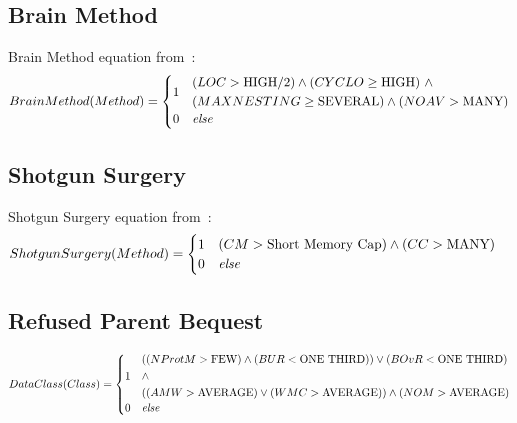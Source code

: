 \documentclass{article}
\begin{document}
\subsection{Brain Method}
Brain Method equation from~\cite{Lanza2006}:
\begin{equation}
BrainMethod(Method) = 
    \begin{cases}
        1 & \!\begin{aligned}
                & (LOC > \text{HIGH}/2) \land (CYCLO \geq \text{HIGH})~\land \\
                & (MAXNESTING \geq \text{SEVERAL}) \land (NOAV > \text{MANY}) 
            \end{aligned} \\ 
                        0 & \text{\textit{else}} 
        \end{cases} 
\label{eq:brainmethod}
\end{equation}

\subsection{Shotgun Surgery}
Shotgun Surgery equation from~\cite{Lanza2006}:
\begin{equation}
ShotgunSurgery(Method) = 
    \begin{cases}
        1 & \!\begin{aligned}
                & (CM > \text{Short Memory Cap}) \land (CC > \text{MANY})
            \end{aligned} \\ 
                        0 & \text{\textit{else}} 
        \end{cases} 
\label{eq:surgery}
\end{equation}

\subsection{Refused Parent Bequest}
\begin{equation}
DataClass(Class) = \begin{cases} 
                        1 & \!\begin{aligned} 
                                & ((NProtM > \text{FEW}) \land (BUR < \text{ONE THIRD})) \lor (BOvR < \text{ONE THIRD}) \\
                                & \land \\
                                & ((AMW > \text{AVERAGE}) \lor (WMC > \text{AVERAGE})) \land (NOM > \text{AVERAGE})
                                \end{aligned} \\
                        0 & \text{\textit{else}} \\
                    \end{cases} 
\label{eq:refusedbequest}
\end{equation}
\end{document}
